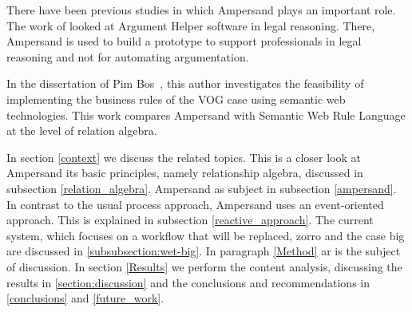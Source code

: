 There have been previous studies in which Ampersand plays an important role.
The work of  looked at Argument Helper software in legal reasoning.
There, Ampersand is used to build a prototype to support professionals in legal reasoning and not for automating argumentation.

In the dissertation of Pim Bos~, this author investigates the feasibility of implementing the business rules of the VOG case using semantic web technologies.
This work compares Ampersand with Semantic Web Rule Language at the level of relation algebra.

In section \ref{context} we discuss the related topics.
This is a closer look at Ampersand its basic principles, namely relationship algebra, discussed in subsection \ref{relation_algebra}.
Ampersand as subject in subsection \ref{ampersand}.
In contrast to the usual process approach, Ampersand uses an event-oriented approach. This is explained in subsection \ref{reactive_approach}.
The current system, which focuses on a workflow that will be replaced, \acrshort{zorro} and the case \acrshort{big} are discussed in \ref{subsubsection:wet-big}.
In paragraph \ref{Method} \acrshort{ar} is the subject of discussion.
In section \ref{Results} we perform the content analysis, discussing the results in \ref{section:discussion} and the conclusions and recommendations in \ref{conclusions} and \ref{future_work}.


